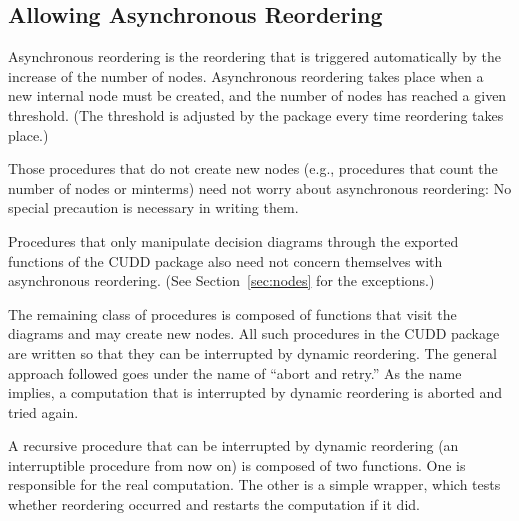 \documentclass[11pt]{article}
\begin{document}
\subsection{Allowing Asynchronous Reordering}
\label{sec:async}

Asynchronous reordering is the reordering that is triggered
automatically by the increase of the number of nodes. Asynchronous
reordering takes place when a new internal node must be created, and
the number of nodes has reached a given
threshold. (The threshold is adjusted by
the package every time reordering takes place.)

Those procedures that do not create new nodes (e.g., procedures that
count the number of nodes or minterms) need
not worry about asynchronous reordering: No special precaution is
necessary in writing them.

Procedures that only manipulate decision diagrams through the exported
functions of the CUDD package also need not concern themselves with
asynchronous reordering. (See Section~\ref{sec:nodes} for the
exceptions.)

The remaining class of procedures is composed of functions that visit
the diagrams and may create new nodes. All such procedures in the CUDD
package are written so that they can be interrupted by dynamic
reordering. The general approach followed goes under the name of
``abort and retry.'' As the name
implies, a computation that is interrupted by dynamic reordering is
aborted and tried again.

A recursive procedure that can be interrupted by dynamic reordering
(an interruptible procedure
from now on) is composed of two functions.  One is responsible for the
real computation. The other is a simple
wrapper, which tests whether
reordering occurred and restarts the computation if it did.
\end{document}
